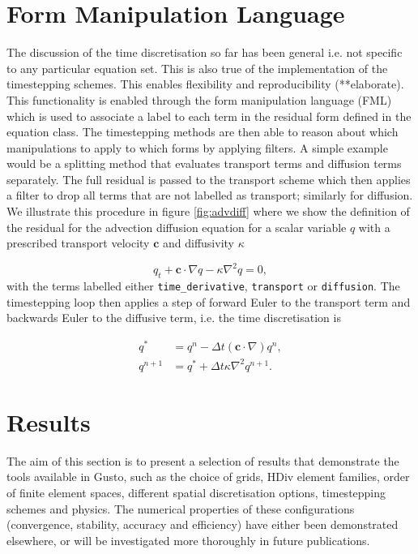 \documentclass[journal abbreviation, manuscript]{copernicus}
\def\MM#1{\boldsymbol{#1}}
\begin{document}
\section{Form Manipulation Language}
\label{sec: FML}
The discussion of the time discretisation so far has been general i.e.
not specific to any particular equation set. This is also true of the
implementation of the timestepping schemes. This enables flexibility
and reproducibility (**elaborate). This functionality is enabled
through the form manipulation language (FML) which is used to
associate a label to each term in the residual form defined in the
equation class. The timestepping methods are then able to reason about
which manipulations to apply to which forms by applying filters. A
simple example would be a splitting method that evaluates transport
terms and diffusion terms separately. The full residual is passed to
the transport scheme which then applies a filter to drop all terms
that are not labelled as transport; similarly for diffusion. We
illustrate this procedure in figure \ref{fig:advdiff} where we show
the definition of the residual for the advection diffusion equation
for a scalar variable $q$ with a prescribed transport velocity
$\MM{c}$ and diffusivity $\kappa$

\begin{equation}
  q_t + \MM{c}\cdot\nabla q - \kappa\nabla^2 q = 0,
\end{equation}
with the terms labelled either \texttt{time\_derivative},
\texttt{transport} or \texttt{diffusion}. The timestepping loop then
applies a step of forward Euler to the transport term and backwards
Euler to the diffusive term, i.e. the time discretisation is

\begin{align}
  q^* &= q^n - \Delta t (\MM{c}\cdot\nabla) q^n, \\
  q^{n+1} &= q^* + \Delta t \kappa \nabla^2 q^{n+1}.
\end{align}



\section{Results}
\label{sec: results}
The aim of this section is to present a selection of results that
demonstrate the tools available in Gusto, such as the choice of grids,
HDiv element families, order of finite element spaces, different
spatial discretisation options, timestepping schemes and physics. The
numerical properties of these configurations (convergence, stability,
accuracy and efficiency) have either been demonstrated elsewhere, or
will be investigated more thoroughly in future publications.
\end{document}
